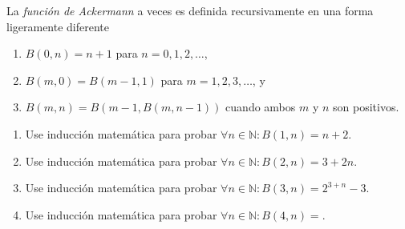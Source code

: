 \begin{solution}
	
\end{solution}

\begin{exercise}
La \emph{función de Ackermann} a veces es definida recursivamente en una forma ligeramente diferente
\begin{enumerate}[label={Regla~\arabic*}]
	\item $B\left(0,n\right)=n+1$ para $n=0,1,2,\ldots$,
	\item $B\left(m,0\right)=B\left(m-1,1\right)$ para $m=1,2,3,\ldots$, y
	\item $B\left(m,n\right)=B\left(m-1,B\left(m,n-1\right)\right)$ cuando ambos $m$ y $n$ son positivos.
\end{enumerate}

\begin{enumerate}
	\item Use inducción matemática para probar $\forall n\in\mathds{N}\colon B\left(1,n\right)=n+2$.
	\item Use inducción matemática para probar $\forall n\in\mathds{N}\colon B\left(2,n\right)=3+2n$.
	\item Use inducción matemática para probar $\forall n\in\mathds{N}\colon B\left(3,n\right)=2^{3+n}-3$.
	\item Use inducción matemática para probar $\forall n\in\mathds{N}\colon B\left(4,n\right)=$.
\end{enumerate}
\end{exercise}

\begin{solution}
	
\end{solution}

